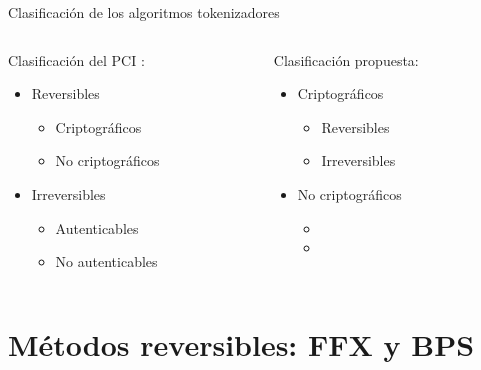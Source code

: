 \documentclass{beamer}
\begin{document}
  \begin{frame}{Clasificación de los algoritmos tokenizadores}
    \begin{center}
      \begin{columns}
        \begin{column}{0.5\textwidth}
          Clasificación del PCI \cite{}:
          \vspace{1.0em}
          \begin{itemize}
            \item Reversibles
            \begin{itemize}
              \item Criptográficos
              \item No criptográficos
            \end{itemize}
            \item Irreversibles
            \begin{itemize}
              \item Autenticables
              \item No autenticables
            \end{itemize}
          \end{itemize}
        \end{column}
        \begin{column}{0.5\textwidth}
          Clasificación propuesta:
          \vspace{1.0em}
          \begin{itemize}
            \item Criptográficos
            \begin{itemize}
              \item Reversibles
              \item Irreversibles
            \end{itemize}
            \item No criptográficos
            \begin{itemize}
              \item[]
              \item[]
            \end{itemize}
          \end{itemize}
        \end{column}
      \end{columns}
    \end{center}
  \end{frame}

  \section{Métodos reversibles: FFX y BPS}
\end{document}
